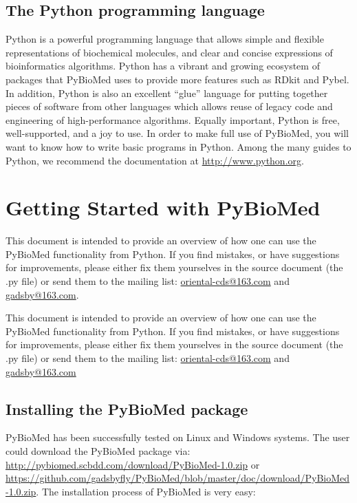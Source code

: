 \documentclass[letterpaper,10pt,english]{sphinxmanual}
\begin{document}
\section{The Python programming language}
\label{overview:the-python-programming-language}
Python is a powerful programming language that allows simple and flexible representations of biochemical molecules, and clear and concise expressions of bioinformatics algorithms. Python has a vibrant and growing ecosystem of packages that PyBioMed uses to provide more features such as RDkit and Pybel. In addition, Python is also an excellent “glue” language for putting together pieces of software from other languages which allows reuse of legacy code and engineering of high-performance algorithms. Equally important, Python is free, well-supported, and a joy to use. In order to make full use of PyBioMed, you will want to know how to write basic programs in Python. Among the many guides to Python, we recommend the documentation at \url{http://www.python.org}.


\chapter{Getting Started with PyBioMed}
\label{User_guide:getting-started-with-pybiomed}\label{User_guide::doc}\label{User_guide:pyinter}
This document is intended to provide an overview of how one can use the PyBioMed functionality from Python. If you find mistakes, or have suggestions for improvements, please either fix them yourselves in the source document (the .py file) or send them to the mailing list: \href{mailto:oriental-cds@163.com}{oriental-cds@163.com} and \href{mailto:gadsby@163.com}{gadsby@163.com}.

This document is intended to provide an overview of how one can use the PyBioMed functionality from Python. If you find mistakes, or have suggestions for improvements, please either fix them yourselves in the source document (the .py file) or send them to the mailing list: \href{mailto:oriental-cds@163.com}{oriental-cds@163.com} and \href{mailto:gadsby@163.com}{gadsby@163.com}


\section{Installing the PyBioMed package}
\label{User_guide:installing-the-pybiomed-package}
PyBioMed has been successfully tested on Linux and Windows systems. The user could download the
PyBioMed package via: \url{http://pybiomed.scbdd.com/download/PyBioMed-1.0.zip} or  \url{https://github.com/gadsbyfly/PyBioMed/blob/master/doc/download/PyBioMed-1.0.zip}. The installation process of PyBioMed is very easy:
\end{document}
